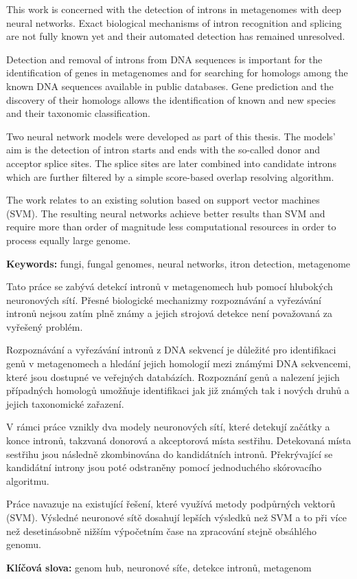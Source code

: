 \begin{minipage}[t]{0.48\textwidth}
  This work is concerned with the detection of introns in metagenomes with deep
  neural networks. Exact biological mechanisms of intron recognition and
  splicing are not fully known yet and their automated detection has remained
  unresolved.

  Detection and removal of introns from DNA sequences is important for the
  identification of genes in metagenomes and for searching for homologs among
  the known DNA sequences available in public databases. Gene prediction and
  the discovery of their homologs allows the identification of known and new
  species and their taxonomic classification.

  Two neural network models were developed as part of this thesis. The models'
  aim is the detection of intron starts and ends with the so-called donor and
  acceptor splice sites. The splice sites are later combined into candidate
  introns which are further filtered by a simple score-based overlap resolving
  algorithm.

  The work relates to an existing solution based on support vector machines
  (SVM). The resulting neural networks achieve better results than SVM and
  require more than order of magnitude less computational resources in order to
  process equally large genome.

  \vspace{\baselineskip}
  \textbf{Keywords:} fungi, fungal genomes, neural networks, itron detection,
  metagenome
\end{minipage}
\hspace{0.04\textwidth}
\begin{minipage}[t]{0.48\textwidth}
  Tato práce se zabývá detekcí intronů v metagenomech hub pomocí hlubokých
  neuronových sítí. Přesné biologické mechanizmy rozpoznávání a vyřezávání
  intronů nejsou zatím plně známy a jejich strojová detekce není považovaná za
  vyřešený problém.

  Rozpoznávání a vyřezávání intronů z DNA sekvencí je důležité pro identifikaci
  genů v metagenomech a hledání jejich homologií mezi známými DNA sekvencemi,
  které jsou dostupné ve veřejných databázích. Rozpoznání genů a nalezení
  jejich případných homologů umožňuje identifikaci jak již známých tak i nových
  druhů a jejich taxonomické zařazení.

  V rámci práce vznikly dva modely neuronových sítí, které detekují začátky a
  konce intronů, takzvaná donorová a akceptorová místa sestřihu. Detekovaná
  místa sestřihu jsou následně zkombinována do kandidátních intronů.
  Překrývající se kandidátní introny jsou poté odstraněny pomocí jednoduchého
  skórovacího algoritmu.

  Práce navazuje na existující řešení, které využívá metody podpůrných vektorů
  (SVM). Výsledné neuronové sítě dosahují lepších výsledků než SVM a to při
  více než desetinásobně nižším výpočetním čase na zpracování stejně obsáhlého
  genomu.

  \vspace{\baselineskip}
  \textbf{Klíčová slova:} genom hub, neuronové síťe, detekce intronů, metagenom
\end{minipage}
